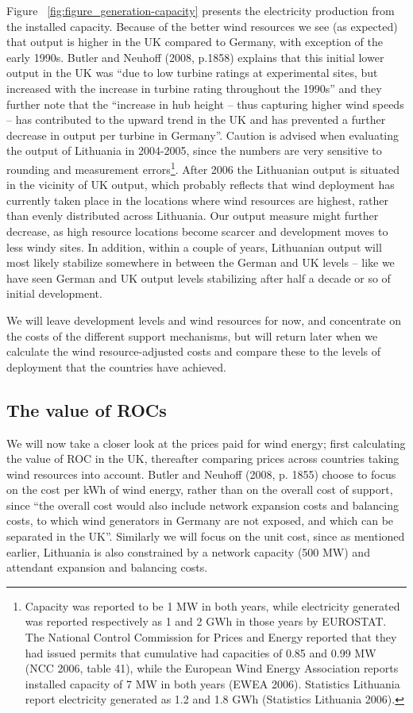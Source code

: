 \documentclass[a4paper, 12pt]{article}
\begin{document}
Figure ~\ref{fig:figure_generation-capacity} presents the electricity production from the installed capacity. Because of the better wind resources we see (as expected) that output is higher in the UK compared to Germany, with exception of the early 1990s. Butler and Neuhoff (2008, p.1858) explains that this initial lower output in the UK was ``due to low turbine ratings at experimental sites, but increased with the increase in turbine rating throughout the 1990s'' and they further note that the ``increase in hub height – thus capturing higher wind speeds – has contributed to the upward trend in the UK and has prevented a further decrease in output per turbine in Germany''. Caution is advised when evaluating the output of Lithuania in 2004-2005, since the numbers are very sensitive to rounding and measurement errors\footnote{Capacity was reported to be 1 MW in both years, while electricity generated was reported respectively as 1 and 2 GWh in those years by EUROSTAT. The National Control Commission for Prices and Energy reported that they had issued permits that cumulative had capacities of 0.85 and 0.99 MW (NCC 2006, table 41), while the European Wind Energy Association reports installed capacity of 7 MW in both years (EWEA 2006). Statistics Lithuania report electricity generated as 1.2 and 1.8 GWh (Statistics Lithuania 2006).}. After 2006 the Lithuanian output is situated in the vicinity of UK output, which probably reflects that wind deployment has currently taken place in the locations where wind resources are highest, rather than evenly distributed across Lithuania. Our output measure might further decrease, as high resource locations become scarcer and development moves to less windy sites. In addition, within a couple of years, Lithuanian output will most likely stabilize somewhere in between the German and UK levels – like we have seen German and UK output levels stabilizing after half a decade or so of initial development. 

We will leave development levels and wind resources for now, and concentrate on the costs of the different support mechanisms, but will return later when we calculate the wind resource-adjusted costs and compare these to the levels of deployment that the countries have achieved.

\subsection{The value of ROCs}

We will now take a closer look at the prices paid for wind energy; first calculating the value of ROC in the UK, thereafter comparing prices across countries taking wind resources into account. Butler and Neuhoff (2008, p. 1855) choose to focus on the cost per kWh of wind energy, rather than on the overall cost of support, since ``the overall cost would also include network expansion costs and balancing costs, to which wind generators in Germany are not exposed, and which can be separated in the UK''. Similarly we will focus on the unit cost, since as mentioned earlier, Lithuania is also constrained by a network capacity (500 MW) and attendant expansion and balancing costs.
\end{document}
